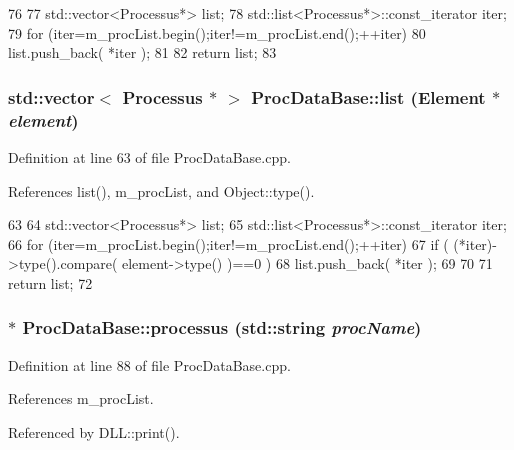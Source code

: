 \begin{DoxyCode}
76                                            {
77   std::vector<Processus*> list;
78   std::list<Processus*>::const_iterator iter;
79   for (iter=m_procList.begin();iter!=m_procList.end();++iter){
80     list.push_back( *iter );        
81   }
82   return list;
83 }
\end{DoxyCode}
\hypertarget{classProcDataBase_a6f17bfad64929fa887c6aafb0080354b}{
\subsubsection[{list}]{\setlength{\rightskip}{0pt plus 5cm}std::vector$<$ {\bf Processus} $\ast$ $>$ ProcDataBase::list ({\bf Element} $\ast$ {\em element})}}
\label{classProcDataBase_a6f17bfad64929fa887c6aafb0080354b}


Definition at line 63 of file ProcDataBase.cpp.

References list(), m\_\-procList, and Object::type().


\begin{DoxyCode}
63                                                             {
64   std::vector<Processus*> list;
65   std::list<Processus*>::const_iterator iter;
66   for (iter=m_procList.begin();iter!=m_procList.end();++iter){
67     if ( (*iter)->type().compare( element->type() )==0 ){
68       list.push_back( *iter );        
69     }
70   }
71   return list;
72 }
\end{DoxyCode}
\hypertarget{classProcDataBase_a839b15c7bc0d73f5ff0f2516c3cb418e}{
\subsubsection[{processus}]{ $\ast$ ProcDataBase::processus (std::string {\em procName})}}
\label{classProcDataBase_a839b15c7bc0d73f5ff0f2516c3cb418e}


Definition at line 88 of file ProcDataBase.cpp.

References m\_\-procList.

Referenced by DLL::print().


